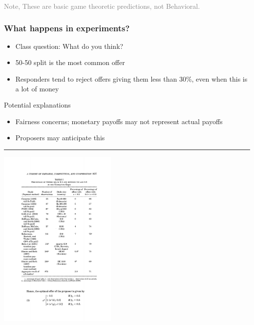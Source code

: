 \documentclass[]{article}
\providecommand{\tightlist}{%
  \setlength{\itemsep}{0pt}\setlength{\parskip}{0pt}}
\begin{document}
\textcolor{gray}{Note, These are basic game theoretic predictions, not Behavioral.}

\hypertarget{what-happens-in-experiments}{%
\subsubsection{What happens in experiments?}\label{what-happens-in-experiments}}

\begin{itemize}
\tightlist
\item
  Class question: What do you think?
\end{itemize}

\bigskip

\begin{itemize}
\tightlist
\item
  50-50 split is the most common offer
\item
  Responders tend to reject offers giving them less than 30\%, even when this is a lot of money
\end{itemize}

\bigskip

Potential explanations

\begin{itemize}
\tightlist
\item
  Fairness concerns; monetary payoffs may not represent actual payoffs
\item
  Proposers may anticipate this
\end{itemize}

\begin{center}\rule{0.5\linewidth}{\linethickness}\end{center}

\includegraphics[height=3.5in]{picsfigs/ult_table.pdf}
\end{document}
